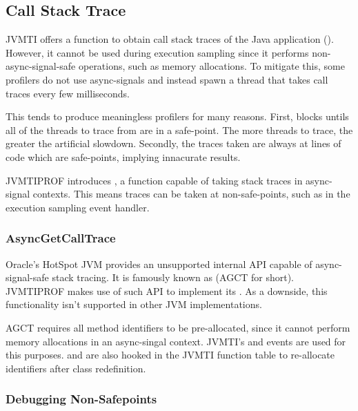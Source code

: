 
\subsection{Call Stack Trace} \label{sec:impl_callstacktrace}

JVMTI offers a function to obtain call stack traces of the Java application (). However, it cannot be used during execution sampling since it performs non-async-signal-safe operations, such as memory allocations. To mitigate this, some profilers do not use async-signals and instead spawn a thread that takes call traces every few milliseconds.

This tends to produce meaningless profilers for many reasons. First,  blocks untils all of the threads to trace from are in a safe-point. The more threads to trace, the greater the artificial slowdown. Secondly, the traces taken are always at lines of code which are safe-points, implying innacurate results.

JVMTIPROF introduces , a function capable of taking stack traces in async-signal contexts. This means traces can be taken at non-safe-points, such as in the execution sampling event handler.

\subsubsection*{AsyncGetCallTrace}

Oracle's HotSpot JVM provides an unsupported internal API capable of async-signal-safe stack tracing. It is famously known as  (AGCT for short). JVMTIPROF makes use of such API to implement its . As a downside, this functionality isn't supported in other JVM implementations.

AGCT requires all method identifiers to be pre-allocated, since it cannot perform memory allocations in an async-singal context. JVMTI's  and  events are used for this purposes.  and  are also hooked in the JVMTI function table to re-allocate identifiers after class redefinition.

\subsubsection*{Debugging Non-Safepoints}

